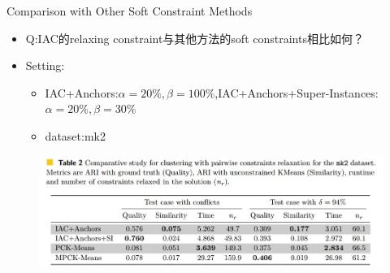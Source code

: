 \documentclass{beamer}
\begin{document}
\begin{frame}{Comparison with Other Soft Constraint Methods}
    \begin{itemize}
        \item Q:IAC的relaxing constraint与其他方法的soft constraints相比如何？
        \item Setting:
        \begin{itemize}
            \item IAC+Anchors:$\alpha=20\%,\beta=100\%$,IAC+Anchors+Super-Instances:$\alpha=20\%,\beta=30\%$
            \item dataset:mk2
        \end{itemize}
    \end{itemize}
    \begin{figure}
        \centering
        \includegraphics[width=0.8\linewidth]{./images/runtime-multi.jpg}
    \end{figure}

\end{frame}
\end{document}
